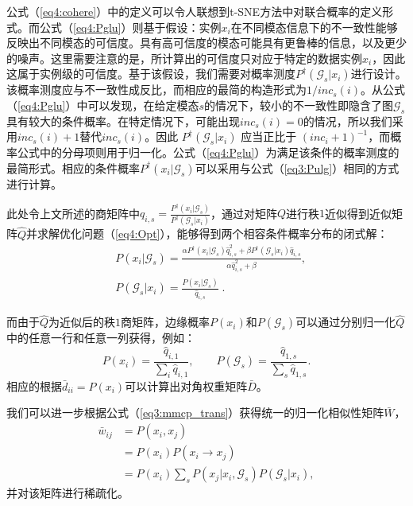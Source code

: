 公式（\ref{eq4:cohere}）中的定义可以令人联想到t-SNE\cite{maaten2008visualizing}方法中对联合概率的定义形式。而公式（\ref{eq4:Pglu}）则基于假设：实例$x_i$在不同模态信息下的不一致性能够反映出不同模态的可信度。具有高可信度的模态可能具有更鲁棒的信息，以及更少的噪声。这里需要注意的是，所计算出的可信度只对应于特定的数据实例$x_i$，因此这属于实例级的可信度。基于该假设，我们需要对概率测度$ P^\dagger(\mathcal{G}_s|x_i) $进行设计。该概率测度应与不一致性成反比，而相应的最简的构造形式为$ 1/inc_s(i) $。从公式（\ref{eq4:Pglu}）中可以发现，在给定模态$s$的情况下，较小的不一致性即隐含了图$\mathcal{G}_s$具有较大的条件概率。在特定情况下，可能出现$ inc_s(i) =0 $的情况，所以我们采用$ inc_s(i) +1 $替代$ inc_s(i)$。因此 $ P^\dagger(\mathcal{G}_s|x_i) $ 应当正比于 $ (inc_i+1)^{-1} $，而概率公式中的分母项则用于归一化。公式（\ref{eq4:Pglu}）为满足该条件的概率测度的最简形式。相应的条件概率$P^\dagger(x_i|\mathcal{G}_s)$可以采用与公式（\ref{eq3:Pulg}）相同的方式进行计算。

此处令上文所述的商矩阵中$q_{i,s} = \frac{P^\dagger(x_i|\mathcal{G}_s)}{P^\dagger(\mathcal{G}_s|x_i)}$，通过对矩阵$Q$进行秩$1$近似得到近似矩阵$\hat{Q}$并求解优化问题（\ref{eq4:Opt}），能够得到两个相容条件概率分布的闭式解：
\begin{equation}
\begin{split}
&P(x_i|\mathcal{G}_s) = \frac{\alpha P^\dagger(x_i|\mathcal{G}_s)\hat{{q}}_{i,s}^2+\beta P^\dagger(\mathcal{G}_s|x_i)\hat{{q}}_{i,s}}{\alpha \hat{{q}}_{i,s}^2 + \beta},\\
&P(\mathcal{G}_s|x_i) = \frac{P(x_i|\mathcal{G}_s)}{\hat{{q}}_{i,s}}\;. 
\end{split}
\label{eq4:OptSlv}
\end{equation}

而由于$\hat{Q}$为近似后的秩$1$商矩阵，边缘概率$P(x_i)$和$P(\mathcal{G}_s)$可以通过分别归一化$\hat{Q}$中的任意一行和任意一列获得，例如：
\begin{equation}
    P(x_i) = \frac{\hat{q}_{i,1}}{\sum_i\hat{q}_{i,1}}, \quad\quad P(\mathcal{G}_s) = \frac{\hat{q}_{1,s}}{\sum_s\hat{q}_{1,s}}.
\end{equation}
相应的根据$\bar{d}_{ii}=P(x_i)$可以计算出对角权重矩阵$\bar{D}$。

我们可以进一步根据公式（\ref{eq3:mmcp_trans}）获得统一的归一化相似性矩阵$\bar{W}$，
\begin{equation}
\begin{split}
\bar{w}_{ij} &= P(x_i,x_j) \\ &= P(x_i)P(x_i\rightarrow x_j)\\
&=P(x_i)\sum_s P(x_j|x_i, \mathcal{G}_s)P(\mathcal{G}_s|x_i), 
\end{split}
\label{eq4:uni_aff}
\end{equation}
并对该矩阵进行稀疏化。


